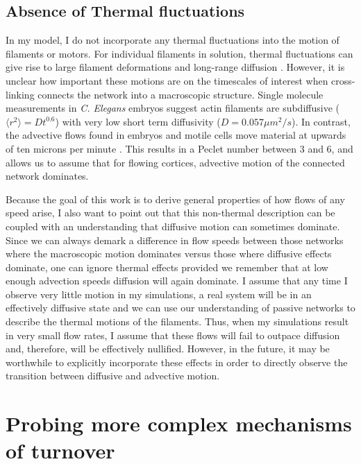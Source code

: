 \subsection{Absence of Thermal fluctuations}
In my model, I do not incorporate any thermal fluctuations into the motion of filaments or motors.  For individual filaments in solution, thermal fluctuations can give rise to large filament deformations and long-range diffusion \cite{PhysRevE.69.061921}.  However, it is unclear how important these motions are on the timescales of interest when cross-linking connects the network into a macroscopic structure.  Single molecule measurements  in \textit{C. Elegans} embryos \cite{Robin:2014aa} suggest actin filaments are subdiffusive ($\langle r^2 \rangle = Dt^{0.6}$) with very low short term diffusivity ($D = 0.057 \mu m^2 /s$).  In contrast, the advective flows found in embryos and motile cells move material at upwards of ten microns per minute \cite{Munro2004413, amoeba1, amoeba3}.  This results in a Peclet number between 3 and 6, and allows us to assume that for flowing cortices, advective motion of the connected network dominates.

Because the goal of this work is to derive general properties of how flows of any speed arise, I also want to point out that this non-thermal description can be coupled with an understanding that diffusive motion can sometimes dominate.  Since we can always demark a difference in flow speeds between those networks where the macroscopic motion dominates versus those where diffusive effects dominate, one can ignore thermal effects provided we remember that at low enough advection speeds diffusion will again dominate. I assume that any time I observe very little motion in my simulations, a real system will be in an effectively diffusive state and we can use our understanding of passive networks to describe the thermal motions of the filaments.  Thus, when my simulations result in very small flow rates, I assume that these flows will fail to outpace diffusion and, therefore, will be effectively nullified.  However, in the future, it may be worthwhile to explicitly incorporate these effects in order to directly observe the transition between diffusive and advective motion.

\section{Probing more complex mechanisms of turnover}

